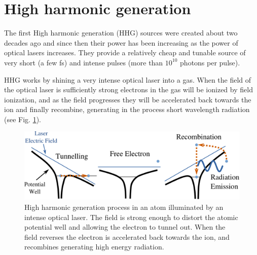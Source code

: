\section{High harmonic generation}

The first High harmonic generation (HHG) sources were created about two decades ago
and since then their power has been increasing as the power of optical lasers
increases. They provide a relatively cheap and tunable source of very
short (a few fs) and intense pulses (more than $10^{10}$ photons per pulse). 

HHG works by shining a very intense optical laser into a gas. When the field of
the optical laser is sufficiently strong electrons in the gas will be ionized
by field ionization, and as the field progresses they will be accelerated back
towards the ion and finally recombine, generating in the process short
wavelength radiation (see Fig. \ref{Fig:HHG_Process}).

\begin{figure}[h]
\centering
  \includegraphics[width=1.0 \columnwidth]{HHG_Picture1.png}
  \caption{High harmonic generation process in an atom illuminated by an intense
    optical laser. The field is strong enough to distort the atomic potential
    well and allowing the electron to tunnel out. When the field reverses the
    electron is accelerated back towards the ion, and recombines generating high
    energy radiation. \cite{Corkum1993Plasma,Lewenstein1994Theory}}
  \label{Fig:HHG_Process}
\end{figure}


